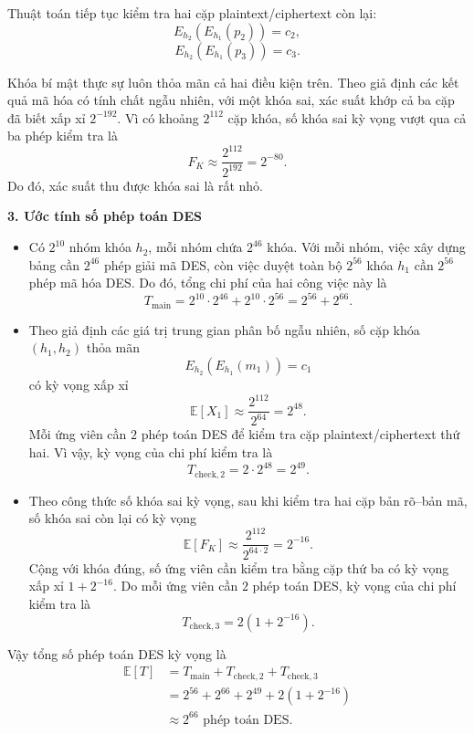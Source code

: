 \begin{loigiai}
Thuật toán tiếp tục kiểm tra hai cặp plaintext/ciphertext
còn lại:
\[
E_{h_2}(E_{h_1}(p_2))=c_2,
\]
\[
E_{h_2}(E_{h_1}(p_3))=c_3.
\]

Khóa bí mật thực sự luôn thỏa mãn cả hai điều kiện trên.
Theo giả định các kết quả mã hóa có tính chất ngẫu nhiên,
với một khóa sai, xác suất khớp cả ba cặp đã biết xấp xỉ
$2^{-192}$. Vì có khoảng $2^{112}$ cặp khóa, số khóa sai
kỳ vọng vượt qua cả ba phép kiểm tra là
\[
F_K \approx \frac{2^{112}}{2^{192}}=2^{-80}.
\]
Do đó, xác suất thu được khóa sai là rất nhỏ.

\textbf{3. Ước tính số phép toán DES}

\begin{itemize}
    \item Có $2^{10}$ nhóm khóa $h_2$, mỗi nhóm chứa $2^{46}$ khóa.
    Với mỗi nhóm, việc xây dựng bảng cần $2^{46}$ phép giải mã DES,
    còn việc duyệt toàn bộ $2^{56}$ khóa $h_1$ cần $2^{56}$ phép mã hóa DES.
    Do đó, tổng chi phí của hai công việc này là
    \[
    T_{\mathrm{main}}
    =2^{10}\cdot 2^{46}+2^{10}\cdot 2^{56}
    =2^{56}+2^{66}.
    \]

    \item Theo giả định các giá trị trung gian phân bố ngẫu nhiên,
    số cặp khóa $(h_1,h_2)$ thỏa mãn
    \[
    E_{h_2}(E_{h_1}(m_1))=c_1
    \]
    có kỳ vọng xấp xỉ
    \[
    \mathbb{E}[X_1]
    \approx \frac{2^{112}}{2^{64}}
    =2^{48}.
    \]
    Mỗi ứng viên cần $2$ phép toán DES để kiểm tra cặp plaintext/ciphertext
    thứ hai. Vì vậy, kỳ vọng của chi phí kiểm tra là
    \[
    T_{\mathrm{check},2}=2\cdot 2^{48}=2^{49}.
    \]

    \item Theo công thức số khóa sai kỳ vọng, sau khi kiểm tra hai cặp
    bản rõ--bản mã, số khóa sai còn lại có kỳ vọng
    \[
    \mathbb{E}[F_K]
    \approx \frac{2^{112}}{2^{64\cdot 2}}
    =2^{-16}.
    \]
    Cộng với khóa đúng, số ứng viên cần kiểm tra bằng cặp thứ ba
    có kỳ vọng xấp xỉ $1+2^{-16}$. Do mỗi ứng viên cần $2$ phép toán
    DES, kỳ vọng của chi phí kiểm tra là
    \[
    T_{\mathrm{check},3}=2(1+2^{-16}).
    \]
\end{itemize}

Vậy tổng số phép toán DES kỳ vọng là
\[
\begin{aligned}
\mathbb{E}[T]
&=T_{\mathrm{main}}+T_{\mathrm{check},2}
  +T_{\mathrm{check},3}\\
&=2^{56}+2^{66}+2^{49}+2(1+2^{-16})\\
&\approx \boxed{2^{66}\text{ phép toán DES}}.
\end{aligned}
\]


\end{loigiai}
